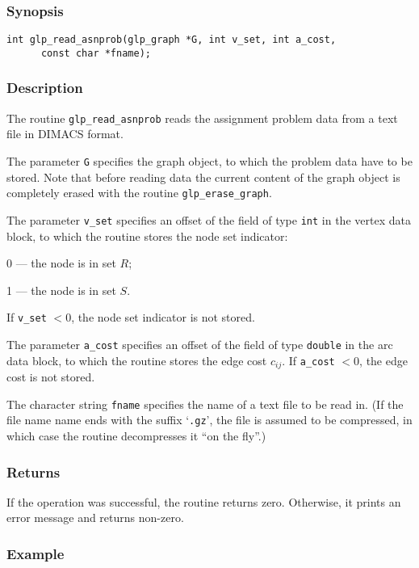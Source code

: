 \subsubsection*{Synopsis}

\begin{verbatim}
int glp_read_asnprob(glp_graph *G, int v_set, int a_cost,
      const char *fname);
\end{verbatim}

\subsubsection*{Description}

The routine \verb|glp_read_asnprob| reads the assignment problem data
from a text file in DIMACS format.

The parameter \verb|G| specifies the graph object, to which the problem
data have to be stored. Note that before reading data the current
content of the graph object is completely erased with the routine
\verb|glp_erase_graph|.

The parameter \verb|v_set| specifies an offset of the field of type
\verb|int| in the vertex data block, to which the routine stores the
node set indicator:

0 --- the node is in set $R$;

1 --- the node is in set $S$.

\noindent
If \verb|v_set| $<0$, the node set indicator is not stored.

The parameter \verb|a_cost| specifies an offset of the field of type
\verb|double| in the arc data block, to which the routine stores the
edge cost $c_{ij}$. If \verb|a_cost| $<0$, the edge cost is not stored.

The character string \verb|fname| specifies the name of a text file to
be read in. (If the file name name ends with the suffix `\verb|.gz|',
the file is assumed to be compressed, in which case the routine
decompresses it ``on the fly''.)

\subsubsection*{Returns}

If the operation was successful, the routine returns zero. Otherwise,
it prints an error message and returns non-zero.

\newpage

\subsubsection*{Example}

